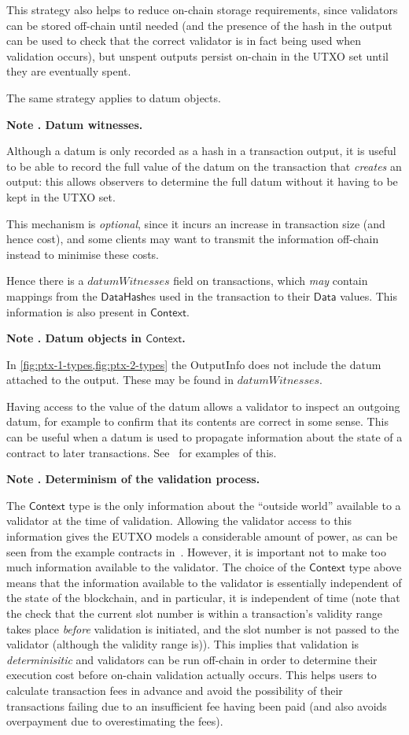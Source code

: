 \documentclass[a4paper]{article}
\newcounter{note}
\newcommand{\note}[1]{
  \bigskip
  \refstepcounter{note}
  \noindent\textbf{Note \thenote. #1}
}
\newcommand{\s}{\textsf}  %
\newcommand{\mi}[1]{\ensuremath{\mathit{#1}}}
\newcommand{\ctx}{\ensuremath{\s{Context}}}
\newcommand{\DataHash}{\ensuremath{\s{DataHash}}}
\newcommand{\datumWits}{\mi{datumWitnesses}}
\newcommand{\Data}{\ensuremath{\s{Data}}}
\begin{document}
This strategy also helps to reduce on-chain
storage requirements, since validators can be stored off-chain until
needed (and the presence of the hash in the output can be used to
check that the correct validator is in fact being used when validation
occurs), but unspent outputs persist on-chain in the UTXO set until
they are eventually spent.

The same strategy applies to datum objects.

\note{Datum witnesses.}
\label{note:datum-witnesses}
Although a datum is only recorded as a hash in a transaction output,
it is useful to be able to record the full value of the datum on the
transaction that \emph{creates} an output: this allows observers to
determine the full datum without it having to be kept in the UTXO set.

This mechanism is \emph{optional}, since it incurs an increase in transaction
size (and hence cost), and some clients may want to transmit the information
off-chain instead to minimise these costs.

Hence there is a $\datumWits$ field on transactions, which \emph{may}
contain mappings from the $\DataHash$es used in the transaction to
their \Data{} values. This information is also present in \ctx{}.

\note{Datum objects in \ctx{}.}
\label{note:datum-objects-in-ptx}
In \cref{fig:ptx-1-types,fig:ptx-2-types} the
\textsf{OutputInfo} does not include the datum attached to the output.
These may be found in $\datumWits$.

Having access to the value of the datum allows a validator to inspect
an outgoing datum, for example to confirm that its contents are
correct in some sense. This can be useful when a datum is used to
propagate information about the state of a contract to later
transactions.  See~\cite{Plutus-book} for examples of this.

\note{Determinism of the validation process.}
\label{note:validation-determinism} The \ctx{} type is the only
information about the ``outside world'' available to a validator
at the time of validation.  Allowing the validator access to
this information gives the EUTXO models a considerable amount of
power, as can be seen from the example contracts
in~\cite{Plutus-book}.  However, it is important not to make too much
information available to the validator.  The choice of the \ctx{} type
above means that the information available to the validator is
essentially independent of the state of the blockchain, and in
particular, it is independent of time (note that the check that the
current slot number is within a transaction's validity range takes
place \textit{before} validation is initiated, and the slot number is
not passed to the validator (although the validity range is)).  This
implies that validation is \textit{determinisitic} and validators can
be run off-chain in order to determine their execution cost before
on-chain validation actually occurs.  This helps users to calculate
transaction fees in advance and avoid the possibility of their
transactions failing due to an insufficient fee having been paid (and
also avoids overpayment due to overestimating the fees).
\end{document}

